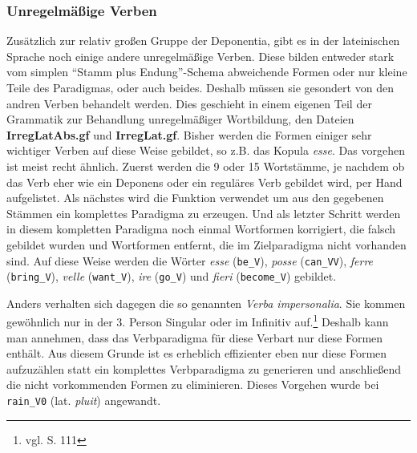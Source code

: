 \subsubsection{Unregelmäßige Verben}
Zusätzlich zur relativ großen Gruppe der Deponentia, gibt es in der lateinischen Sprache noch einige andere unregelmäßige Verben. Diese bilden entweder stark vom simplen ``Stamm plus Endung''-Schema abweichende Formen oder nur kleine Teile des Paradigmas, oder auch beides. Deshalb müssen sie gesondert von den andren Verben behandelt werden. Dies geschieht in einem eigenen Teil der Grammatik zur Behandlung unregelmäßiger Wortbildung, den Dateien \textbf{IrregLatAbs.gf} und \textbf{IrregLat.gf}. Bisher werden die Formen einiger sehr wichtiger Verben auf diese Weise gebildet, so z.B. das Kopula \textit{esse}. Das vorgehen ist meist recht ähnlich. Zuerst werden die 9 oder 15 Wortstämme, je nachdem ob das Verb eher wie ein Deponens oder ein reguläres Verb gebildet wird, per Hand aufgelistet. Als nächstes wird die Funktion verwendet um aus den gegebenen Stämmen ein komplettes Paradigma zu erzeugen. Und als letzter Schritt werden in diesem kompletten Paradigma noch einmal Wortformen korrigiert, die falsch gebildet wurden und Wortformen entfernt, die im Zielparadigma nicht vorhanden sind. Auf diese Weise werden die Wörter \textit{esse} (\texttt{be\_V}), \textit{posse} (\texttt{can\_VV}), \textit{ferre} (\texttt{bring\_V}), \textit{velle} (\texttt{want\_V}), \textit{ire} (\texttt{go\_V}) und \textit{fieri} (\texttt{become\_V}) gebildet. \par
Anders verhalten sich dagegen die so genannten \textit{Verba impersonalia}. Sie kommen gewöhnlich nur in der 3. Person Singular oder im Infinitiv auf.\footnote{vgl. \cite{BAYER-LINDAUER1994} S. 111} Deshalb kann man annehmen, dass das Verbparadigma für diese Verbart nur diese Formen enthält. Aus diesem Grunde ist es erheblich effizienter eben nur diese Formen aufzuzählen statt ein komplettes Verbparadigma zu generieren und anschließend die nicht vorkommenden Formen zu eliminieren. Dieses Vorgehen wurde bei \texttt{rain\_V0} (lat. \textit{pluit}) angewandt.

